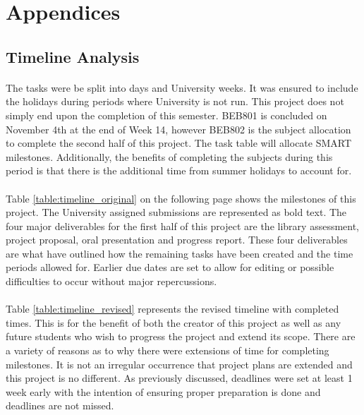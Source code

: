 \section{Appendices}


\subsection{Timeline Analysis} \label{appendix:Timeline}

\paragraph{}
The tasks were be split into days and University weeks. It was ensured to include the holidays during periods where University is not run. This project does not simply end upon the completion of this semester. BEB801 is concluded on November 4th at the end of Week 14, however BEB802 is the subject allocation to complete the second half of this project. The task table will allocate SMART milestones. Additionally, the benefits of completing the subjects during this period is that there is the additional time from summer holidays to account for.

\paragraph{}
Table \ref{table:timeline_original} on the following page shows the milestones of this project. The University assigned submissions are represented as bold text. The four major deliverables for the first half of this project are the library assessment, project proposal, oral presentation and progress report. These four deliverables are what have outlined how the remaining tasks have been created and the time periods allowed for. Earlier due dates are set to allow for editing or possible difficulties to occur without major repercussions. 

\paragraph{}
Table \ref{table:timeline_revised} represents the revised timeline with completed times. This is for the benefit of both the creator of this project as well as any future students who wish to progress the project and extend its scope. There are a variety of reasons as to why there were extensions of time for completing milestones. It is not an irregular occurrence that project plans are extended and this project is no different. As previously discussed, deadlines were set at least 1 week early with the intention of ensuring proper preparation is done and deadlines are not missed.     

